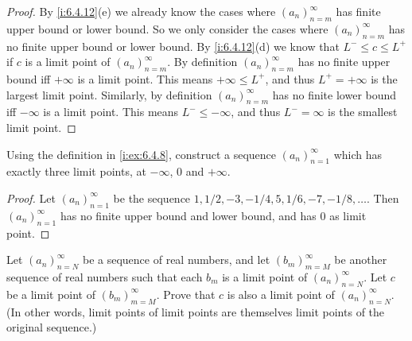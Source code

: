 \begin{proof}
  By \cref{i:6.4.12}(e) we already know the cases where \((a_n)_{n = m}^\infty\) has finite upper bound or lower bound.
  So we only consider the cases where \((a_n)_{n = m}^\infty\) has no finite upper bound or lower bound.
  By \cref{i:6.4.12}(d) we know that \(L^- \leq c \leq L^+\) if \(c\) is a limit point of \((a_n)_{n = m}^\infty\).
  By definition \((a_n)_{n = m}^\infty\) has no finite upper bound iff \(+\infty\) is a limit point.
  This means \(+\infty \leq L^+\), and thus \(L^+ = +\infty\) is the largest limit point.
  Similarly, by definition \((a_n)_{n = m}^\infty\) has no finite lower bound iff \(-\infty\) is a limit point.
  This means \(L^- \leq -\infty\), and thus \(L^- = \infty\) is the smallest limit point.
\end{proof}

\begin{ex}\label{i:ex:6.4.9}
  Using the definition in \cref{i:ex:6.4.8}, construct a sequence \((a_n)_{n = 1}^\infty\) which has exactly three limit points, at \(-\infty\), \(0\) and \(+\infty\).
\end{ex}

\begin{proof}
  Let \((a_n)_{n = 1}^\infty\) be the sequence \(1, 1/2, -3, -1/4, 5, 1/6, -7, -1/8, \dots\).
  Then \((a_n)_{n = 1}^\infty\) has no finite upper bound and lower bound, and has \(0\) as limit point.
\end{proof}

\begin{ex}\label{i:ex:6.4.10}
  Let \((a_n)_{n = N}^\infty\) be a sequence of real numbers, and let \((b_m)_{m = M}^\infty\) be another sequence of real numbers such that each \(b_m\) is a limit point of \((a_n)_{n = N}^\infty\).
  Let \(c\) be a limit point of \((b_m)_{m = M}^\infty\).
  Prove that \(c\) is also a limit point of \((a_n)_{n = N}^\infty\).
  (In other words, limit points of limit points are themselves limit points of the original sequence.)
\end{ex}

